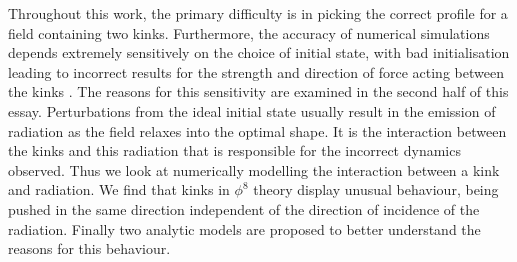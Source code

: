 \documentclass[11pt, oneside]{article}  	%
\numberwithin{equation}{section}
\begin{document}
Throughout this work, the primary difficulty is in picking the correct profile for a field containing two kinks. Furthermore, the accuracy of numerical simulations depends extremely sensitively on the choice of initial state, with bad initialisation leading to incorrect results for the strength and direction of force acting between the kinks \cite{belendryasova}. The reasons for this sensitivity are examined in the second half of this essay. Perturbations from the ideal initial state usually result in the emission of radiation as the field relaxes into the optimal shape. It is the interaction between the kinks and this radiation that is responsible for the incorrect dynamics observed. Thus we look at numerically modelling the interaction between a kink and radiation. We find that kinks in $\phi^8$ theory display unusual behaviour, being pushed in the same direction independent of the direction of incidence of the radiation. Finally two analytic models are proposed to better understand the reasons for this behaviour.
\end{document}
